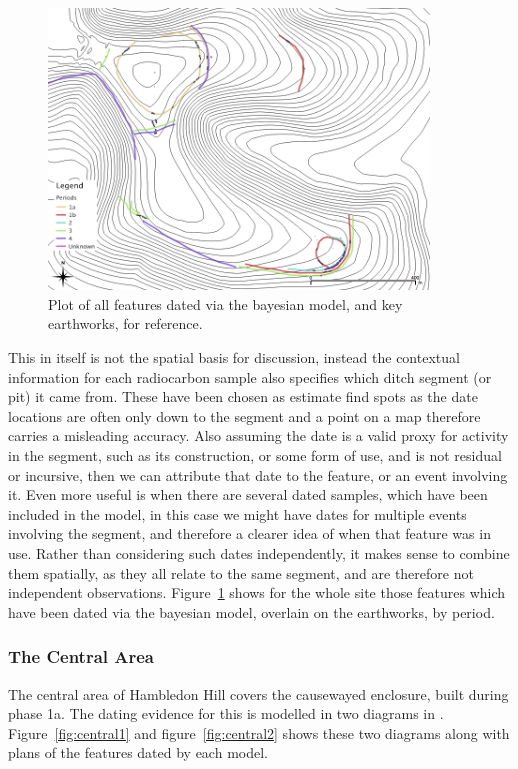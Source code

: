 \begin{figure}
\centering
	\includegraphics[width=0.9\textwidth]{figures/dated-features}
  \caption{Plot of all features dated via the bayesian model, and key earthworks, for reference.}
  \label{fig:dated-features}
\end{figure}

This in itself is not the spatial basis for discussion, instead the contextual information for each radiocarbon sample also specifies which ditch segment (or pit) it came from. These have been chosen as estimate find spots as the date locations are often only down to the segment and a point on a map therefore carries a misleading accuracy. Also assuming the date is a valid proxy for activity in the segment, such as its construction, or some form of use, and is not residual or incursive, then we can attribute that date to the feature, or an event involving it. Even more useful is when there are several dated samples, which have been included in the model, in this case we might have dates for multiple events involving the segment, and therefore a clearer idea of when that feature was in use. Rather than considering such dates independently, it makes sense to combine them spatially, as they all relate to the same segment, and are therefore not independent observations. Figure~\ref{fig:dated-features} shows for the whole site those features which have been dated via the bayesian model, overlain on the earthworks, by period. 

\subsubsection{The Central Area}
The central area of Hambledon Hill covers the causewayed enclosure, built during phase 1a. The dating evidence for this is modelled in two diagrams in \cite{Whittle:2011kl}. Figure~\ref{fig:central1} and figure~\ref{fig:central2} shows these two diagrams along with plans of the features dated by each model.

